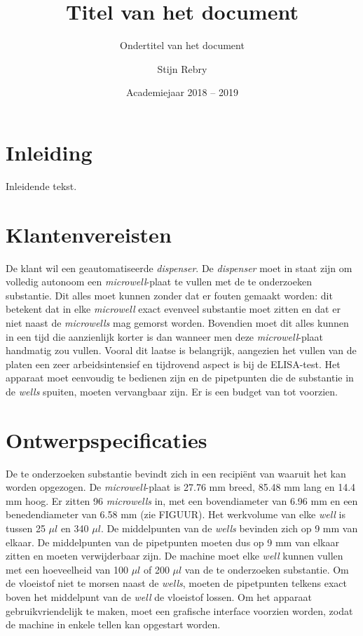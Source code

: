 \documentclass[a4paper,twoside,kulak]{kulakreport} %
\title{Titel van het document}
\subtitle{Ondertitel van het document}
\author{Stijn Rebry}
\institute{KU Leuven Kulak, Wetenschap \& Technologie}
\date{Academiejaar 2018 -- 2019}
\begin{document}

\titlepage

\tableofcontents

\chapter*{Inleiding}
Inleidende tekst.

\chapter{Klantenvereisten}
De klant wil een geautomatiseerde \textit{dispenser}. De \textit{dispenser} moet in staat zijn om volledig autonoom een \textit{microwell}-plaat te vullen met de te onderzoeken substantie. Dit alles moet kunnen zonder dat er fouten gemaakt worden: dit betekent dat in elke \textit{microwell} exact evenveel substantie moet zitten en dat er niet naast de \textit{microwells} mag gemorst worden. Bovendien moet dit alles kunnen in een tijd die aanzienlijk korter is dan wanneer men deze \textit{microwell}-plaat handmatig zou vullen. Vooral dit laatse is belangrijk, aangezien het vullen van de platen een zeer arbeidsintensief en tijdrovend aspect is bij de ELISA-test. Het apparaat moet eenvoudig te bedienen zijn en de pipetpunten die de substantie in de \textit{wells} spuiten, moeten vervangbaar zijn. Er is een budget van  tot  voorzien. 

\chapter{Ontwerpspecificaties}
De te onderzoeken substantie bevindt zich in een recipiënt van waaruit het kan worden opgezogen. De \textit{microwell}-plaat is 27.76 mm breed, 85.48 mm lang en 14.4 mm hoog. Er zitten 96 \textit{microwells} in, met een bovendiameter van 6.96 mm en een benedendiameter van 6.58 mm (zie FIGUUR). Het werkvolume van elke \textit{well} is tussen 25 $\mu l$ en 340 $\mu l$. De middelpunten van de \textit{wells} bevinden zich op 9 mm van elkaar. De middelpunten van de pipetpunten moeten dus op 9 mm van elkaar zitten en moeten verwijderbaar zijn. De machine moet elke \textit{well} kunnen vullen met een hoeveelheid van 100 $\mu l$ of 200 $\mu l$ van de te onderzoeken substantie. Om de vloeistof niet te morsen naast de \textit{wells}, moeten de pipetpunten telkens exact boven het middelpunt van de \textit{well} de vloeistof lossen. Om het apparaat gebruikvriendelijk te maken, moet een grafische interface voorzien worden, zodat de machine in enkele tellen kan opgestart worden.
\end{document}
